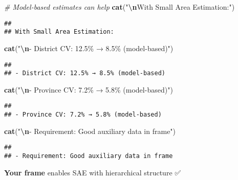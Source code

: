 \documentclass[
]{article}
\newenvironment{Shaded}{\begin{snugshade}}{\end{snugshade}}
\newcommand{\CommentTok}[1]{\textcolor[rgb]{0.56,0.35,0.01}{\textit{#1}}}
\newcommand{\FunctionTok}[1]{\textcolor[rgb]{0.13,0.29,0.53}{\textbf{#1}}}
\newcommand{\NormalTok}[1]{#1}
\newcommand{\SpecialCharTok}[1]{\textcolor[rgb]{0.81,0.36,0.00}{\textbf{#1}}}
\newcommand{\StringTok}[1]{\textcolor[rgb]{0.31,0.60,0.02}{#1}}
\begin{document}
\begin{Shaded}
\begin{Highlighting}[]
\CommentTok{\# Model{-}based estimates can help}
\FunctionTok{cat}\NormalTok{(}\StringTok{"}\SpecialCharTok{\textbackslash{}n}\StringTok{With Small Area Estimation:"}\NormalTok{)}
\end{Highlighting}
\end{Shaded}

\begin{verbatim}
## 
## With Small Area Estimation:
\end{verbatim}

\begin{Shaded}
\begin{Highlighting}[]
\FunctionTok{cat}\NormalTok{(}\StringTok{"}\SpecialCharTok{\textbackslash{}n}\StringTok{{-} District CV: 12.5\% → 8.5\% (model{-}based)"}\NormalTok{)}
\end{Highlighting}
\end{Shaded}

\begin{verbatim}
## 
## - District CV: 12.5% → 8.5% (model-based)
\end{verbatim}

\begin{Shaded}
\begin{Highlighting}[]
\FunctionTok{cat}\NormalTok{(}\StringTok{"}\SpecialCharTok{\textbackslash{}n}\StringTok{{-} Province CV: 7.2\% → 5.8\% (model{-}based)"}\NormalTok{)}
\end{Highlighting}
\end{Shaded}

\begin{verbatim}
## 
## - Province CV: 7.2% → 5.8% (model-based)
\end{verbatim}

\begin{Shaded}
\begin{Highlighting}[]
\FunctionTok{cat}\NormalTok{(}\StringTok{"}\SpecialCharTok{\textbackslash{}n}\StringTok{{-} Requirement: Good auxiliary data in frame"}\NormalTok{)}
\end{Highlighting}
\end{Shaded}

\begin{verbatim}
## 
## - Requirement: Good auxiliary data in frame
\end{verbatim}

\textbf{Your frame} enables SAE with hierarchical structure ✅
\end{document}
